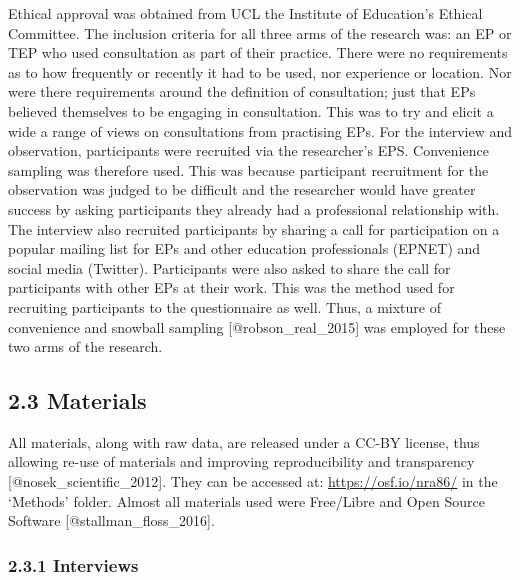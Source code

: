 \documentclass[
]{article}
\begin{document}
Ethical approval was obtained from UCL the Institute of Education's
Ethical Committee. The inclusion criteria for all three arms of the
research was: an EP or TEP who used consultation as part of their
practice. There were no requirements as to how frequently or recently it
had to be used, nor experience or location. Nor were there requirements
around the definition of consultation; just that EPs believed themselves
to be engaging in consultation. This was to try and elicit a wide a
range of views on consultations from practising EPs. For the interview
and observation, participants were recruited via the researcher's EPS.
Convenience sampling was therefore used. This was because participant
recruitment for the observation was judged to be difficult and the
researcher would have greater success by asking participants they
already had a professional relationship with. The interview also
recruited participants by sharing a call for participation on a popular
mailing list for EPs and other education professionals (EPNET) and
social media (Twitter). Participants were also asked to share the call
for participants with other EPs at their work. This was the method used
for recruiting participants to the questionnaire as well. Thus, a
mixture of convenience and snowball sampling {[}@robson\_real\_2015{]}
was employed for these two arms of the research.

\hypertarget{materials}{%
\subsection{2.3 Materials}\label{materials}}

All materials, along with raw data, are released under a CC-BY license,
thus allowing re-use of materials and improving reproducibility and
transparency {[}@nosek\_scientific\_2012{]}. They can be accessed at:
\url{https://osf.io/nra86/} in the `Methods' folder. Almost all
materials used were Free/Libre and Open Source Software
{[}@stallman\_floss\_2016{]}.

\hypertarget{interviews}{%
\subsubsection{2.3.1 Interviews}\label{interviews}}
\end{document}

